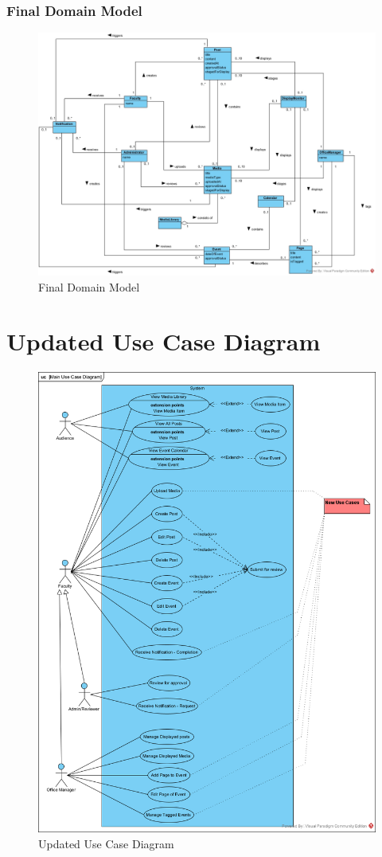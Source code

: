 \documentclass{article}
\begin{document}
\subsubsection{Final Domain Model}
\begin{figure}[H]
    \includegraphics[width=.9\textwidth]{images/DomainModel.jpg}
    \centering
    \caption{Final Domain Model}
    \label{fig:FinalDomain}
\end{figure}

\section{Updated Use Case Diagram}

\begin{figure}[H]
    \includegraphics[width=.9\textwidth]{updatedUseCaseDiagram.png}
    \centering
    \caption{Updated Use Case Diagram}
    \label{fig:updatedUseCaseDiagram}
\end{figure}
\end{document}
